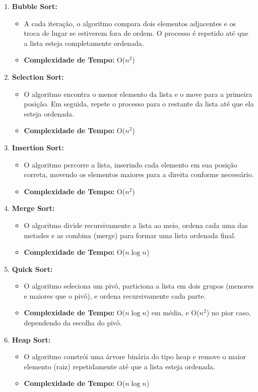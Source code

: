 \documentclass[12pt, a4paper]{report}
\begin{document}
\begin{enumerate}
    \item \textbf{Bubble Sort:}
    \begin{itemize}
        \item A cada iteração, o algoritmo compara dois elementos adjacentes e os troca de lugar se estiverem fora de ordem. O processo é repetido até que a lista esteja completamente ordenada.
        \item \textbf{Complexidade de Tempo:} O($n^2$)
    \end{itemize}

    \item \textbf{Selection Sort:}
    \begin{itemize}
        \item O algoritmo encontra o menor elemento da lista e o move para a primeira posição. Em seguida, repete o processo para o restante da lista até que ela esteja ordenada.
        \item \textbf{Complexidade de Tempo:} O($n^2$)
    \end{itemize}

    \item \textbf{Insertion Sort:}
    \begin{itemize}
        \item O algoritmo percorre a lista, inserindo cada elemento em sua posição correta, movendo os elementos maiores para a direita conforme necessário.
        \item \textbf{Complexidade de Tempo:} O($n^2$)
    \end{itemize}

    \item \textbf{Merge Sort:}
    \begin{itemize}
        \item O algoritmo divide recursivamente a lista ao meio, ordena cada uma das metades e as combina (merge) para formar uma lista ordenada final.
        \item \textbf{Complexidade de Tempo:} O($n \log n$)
    \end{itemize}

    \item \textbf{Quick Sort:}
    \begin{itemize}
        \item O algoritmo seleciona um pivô, particiona a lista em dois grupos (menores e maiores que o pivô), e ordena recursivamente cada parte.
        \item \textbf{Complexidade de Tempo:} O($n \log n$) em média, e O($n^2$) no pior caso, dependendo da escolha do pivô.
    \end{itemize}

    \item \textbf{Heap Sort:}
    \begin{itemize}
        \item O algoritmo constrói uma árvore binária do tipo heap e remove o maior elemento (raiz) repetidamente até que a lista esteja ordenada.
        \item \textbf{Complexidade de Tempo:} O($n \log n$)
    \end{itemize}
    
    
\end{enumerate}
\end{document}
